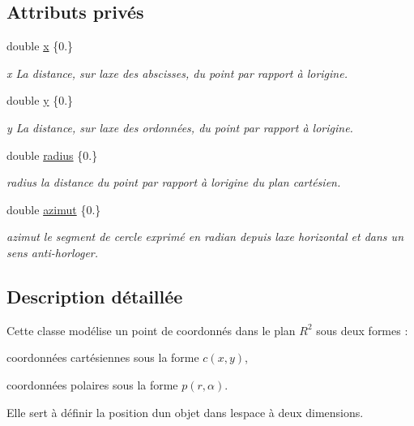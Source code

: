 \subsection*{Attributs privés}
\begin{DoxyCompactItemize}
\item 
double \hyperlink{classPoint_ab99c56589bc8ad5fa5071387110a5bc7}{x} \{0.\}
\begin{DoxyCompactList}\small\item\em x La distance, sur l\textquotesingle{}axe des abscisses, du point par rapport à l\textquotesingle{}origine. \end{DoxyCompactList}\item 
double \hyperlink{classPoint_afa38be143ae800e6ad69ce8ed4df62d8}{y} \{0.\}
\begin{DoxyCompactList}\small\item\em y La distance, sur l\textquotesingle{}axe des ordonnées, du point par rapport à l\textquotesingle{}origine. \end{DoxyCompactList}\item 
double \hyperlink{classPoint_af4f987f16754db370e5d1b3d1bf1fd52}{radius} \{0.\}
\begin{DoxyCompactList}\small\item\em radius la distance du point par rapport à l\textquotesingle{}origine du plan cartésien. \end{DoxyCompactList}\item 
double \hyperlink{classPoint_a873c221d6bc33e2108574d6f1c911f78}{azimut} \{0.\}
\begin{DoxyCompactList}\small\item\em azimut le segment de cercle exprimé en radian depuis l\textquotesingle{}axe horizontal et dans un sens anti-\/horloger. \end{DoxyCompactList}\end{DoxyCompactItemize}


\subsection{Description détaillée}
Cette classe modélise un point de coordonnés dans le plan $ R^2 $ sous deux formes \+: 


\begin{DoxyItemize}
\item coordonnées cartésiennes sous la forme $ c(x, y) $, 
\item coordonnées polaires sous la forme $ p(r, \alpha) $. 
\end{DoxyItemize}Elle sert à définir la position d\textquotesingle{}un objet dans l\textquotesingle{}espace à deux dimensions. 


